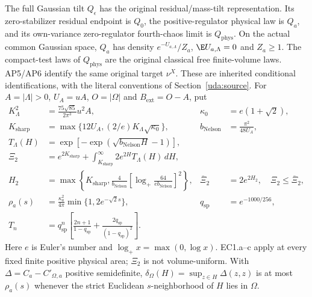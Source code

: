 The full Gaussian tilt $Q_\epsilon$ has the original residual/mass-tilt
representation. Its zero-stabilizer residual endpoint is $Q_0$, the
positive-regulator physical law is $Q_a$, and its own-variance
zero-regulator fourth-chaos limit is $Q_{\mathrm{phys}}$. On the actual
common Gaussian space, $Q_a$ has density $e^{-U_{a,\Lambda}}/Z_a$,
$\E U_{a,\Lambda}=0$ and $Z_a\ge1$. The compact-test laws of
$Q_{\mathrm{phys}}$ are the original classical free finite-volume laws.
AP5/AP6 identify the same original target $\nu^X$. These are inherited
conditional identifications, with the literal conventions of
Section~\ref{uda:source}. For $A=|\Lambda|>0$, $U_A=uA$,
$O=|\Omega|$ and $B_{\mathrm{ext}}=O-A$, put
\begin{align*}
 K_\Lambda^2&=\frac{75\sqrt{85}}{2\pi^3}u^2 A,&
 \kappa_0&=e(1+\sqrt2),\\
 K_{\mathrm{sharp}}&=\max\{12U_A,(2/e)K_\Lambda\sqrt{\kappa_0}\},&
 b_{\mathrm{Nelson}}&=\frac{\pi^2}{48U_A},\\
 T_\Lambda(H)&=\exp[-\exp(\sqrt{b_{\mathrm{Nelson}}H}-1)],\\
 \Xi_2&=e^{2K_{\mathrm{sharp}}}
       +\int_{K_{\mathrm{sharp}}}^\infty2e^{2H}T_\Lambda(H)\,dH,\\
 H_2&=\max\left\{K_{\mathrm{sharp}},
 \frac4{b_{\mathrm{Nelson}}}
 \left[\log_+\frac{64}{e b_{\mathrm{Nelson}}}\right]^2\right\},&
 \overline\Xi_2&=2e^{2H_2},\quad\Xi_2\le\overline\Xi_2,\\
 \rho_a(s)&=\frac{\kappa_a^2}{4\pi}\min\{1,2e^{-\sqrt2s}\},&
 q_{\mathrm{sp}}&=e^{-1000/256},\\
 T_n&=q_{\mathrm{sp}}^n\left[\frac{2n+1}{1-q_{\mathrm{sp}}}
               +\frac{2q_{\mathrm{sp}}}{(1-q_{\mathrm{sp}})^2}\right].
\end{align*}
Here $e$ is Euler's number and $\log_+x=\max(0,\log x)$.
EC1.a--c apply at every fixed finite positive physical area; $\Xi_2$ is
not volume-uniform. With $\Delta=C_a-C'_{\Omega,a}$ positive semidefinite,
$\delta_\Omega(H)=\sup_{z\in H}\Delta(z,z)$ is at most $\rho_a(s)$
whenever the strict Euclidean $s$-neighborhood of $H$ lies in $\Omega$.

